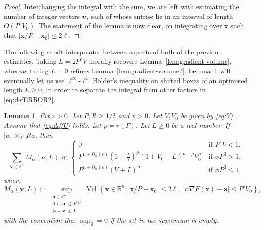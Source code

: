 \documentclass[a4paper,11pt, twoside,reqno]{amsart}
\theoremstyle{plain}
\newtheorem{lemma}[thm]{Lemma}
\theoremstyle{definition}
\theoremstyle{remark}
\newcommand{\bfx}{\bm{x}}
\newcommand{\ZZ}{\mathbb{Z}}
\newcommand{\RR}{\mathbb{R}}
\DeclareMathOperator{\meas}{Vol}
\newcommand{\ve}{\varepsilon}
\renewcommand{\le}{\leqslant}
\renewcommand{\leq}{\leqslant}
\renewcommand{\ge}{\geqslant}
\numberwithin{equation}{section}
\begin{document}
\begin{proof}
Interchanging the integral with the sum, we are left with estimating the number of  integer vectors $\bm{v}$, each of whose entries lie in an interval of length $O(P^\ve V_0)$. The statement of the lemma is now clear,
on integrating over $\bm{x}$ such that $|\bfx/P-\bm{x}_0|\le 2\ell$.
\end{proof}


The following result interpolates between aspects of both of the previous estimates.
Taking $L = 2 P^\ve V$ morally recovers Lemma~\ref{lem:gradient-volume},
whereas taking $L=0$ refines Lemma~\ref{lem:gradient-volume2}.
Lemma~\ref{aislop} will eventually let us use $\ell^\infty$-$\ell^1$ H\"{o}lder's inequality
on shifted boxes of an optimised length $L\ge 0$,
in order to separate the integral from other factors in \eqref{eq:defERROR2}.

\begin{lemma}
\label{aislop}
Fix $\varepsilon>0$.
Let $P,R\ge 1/2$ and $\phi>0$.
Let $V,V_0$ be given by \eqref{eq:V}.
Assume that \eqref{eq:diffU} holds.
Let $\rho=r(F)$.
Let $L\ge 0$ be a real number.
If $|\alpha| \asymp_W R\phi$, then
\begin{equation*}
\sum_{\bm{v}\in \ZZ^n}
M_\alpha(\bm{v},L) \ll
\begin{cases}       
0 &\text{ if $P^\ve V < 1$,}\\
P^{n+O_n(\ve)} (1+\tfrac{L}{V})^\rho (1+V_0+L)^{n-\rho} V_0^\rho & \text{ if $\phi P^3>1$},\\
P^{n+O_n(\ve)} (V+L)^n & \text{ if $\phi P^3\leq 1$},
\end{cases}
\end{equation*}
where
\begin{equation*}
M_\alpha(\bm{v},L) := \sup_{\substack{\bm{a}\in \ZZ^n\\ 
0<|\bm{a}|\leq P^\ve V\\
|\bm{a}-\bm{v}| \le L}}
\meas\left\{
\bfx\in\RR^n:
|\bfx/P-\bm{x}_0|\le 2\ell,\;
|\alpha\nabla F(\bm{x})-\bm{a}|\leq P^\varepsilon V_0
\right\},
\end{equation*}
with the convention that $\sup_{\emptyset} = 0$
if the set in the supremum is empty.

\end{lemma}
\end{document}

